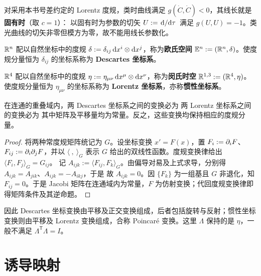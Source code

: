 \begin{example}
    对采用本书号差约定的 Lorentz 度规，类时曲线满足 $g(\dot C,\dot C)<0$，其线长就是\textbf{固有时}（取 $c=1$）：
    以固有时为参数的切矢 $U:=\dv*{}{\tau}$ 满足 $g(U,U)=-1$。类光曲线的切矢非零但模方为零，故不能用线长参数化。
\end{example}

\begin{definition}
    $\mathbb{R}^n$ 配以自然坐标中的度规 $\delta:=\delta_{ij}\,\dd x^i\otimes\dd x^j$，称为\textbf{欧氏空间} $\mathbb E^n:=(\mathbb{R}^n,\delta)$。使度规分量恒为 $\delta_{ij}$ 的坐标系称为 \textbf{Descartes 坐标系}。

    $\mathbb{R}^4$ 配以自然坐标中的度规 $\eta:=\eta_{\mu\nu}\,\dd x^\mu\otimes\dd x^\nu$，称为\textbf{闵氏时空} $\mathbb{R}^{1,3}:=(\mathbb{R}^4,\eta)$。使度规分量恒为 $\eta_{\mu\nu}$ 的坐标系称为 \textbf{Lorentz 坐标系}，亦称\textbf{惯性坐标系}。
\end{definition}

\begin{theorem}
    在连通的重叠域内，两 Descartes 坐标系之间的变换必为
    两 Lorentz 坐标系之间的变换必为
    其中矩阵及平移量均为常量。反之，这些变换均保持相应的度规分量。
\end{theorem}
\begin{proof}
    将两种常度规矩阵统记为 $G$。设坐标变换 $x'=F(x)$，置 $F_i:=\partial_iF$、$F_{ij}:=\partial_i\partial_jF$，并以 $\langle\ ,\ \rangle_G$ 表示 $G$ 给出的双线性函数。度规变换律给出 $\langle F_i,F_j\rangle_G=G_{ij}$。
    记 $A_{ijk}:=\langle F_{ij},F_k\rangle_G$。由偏导对易及上式求导，分别得 $A_{ijk}=A_{jik}$、$A_{ijk}=-A_{ikj}$，于是
    故 $A_{ijk}=0$。因 $\{F_k\}$ 为一组基且 $G$ 非退化，知 $F_{ij}=0$。于是 Jacobi 矩阵在连通域内为常量，$F$ 为仿射变换；代回度规变换律即得矩阵条件及其逆命题。
\end{proof}

因此 Descartes 坐标变换由平移及正交变换组成，后者包括旋转与反射；惯性坐标变换则由平移及 Lorentz 变换组成，合称 Poincar\'e 变换。这里 $\Lambda$ 保持的是 $\eta$，一般不满足 $\Lambda^{\mathsf T}\Lambda=I$。

\section{诱导映射}


